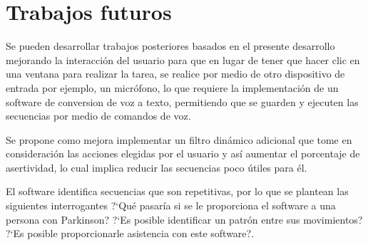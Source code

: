 \section{Trabajos futuros}
Se pueden desarrollar trabajos posteriores basados en el presente desarrollo
 mejorando la interacci\'on del usuario para que en lugar de tener que hacer 
 clic en una ventana para realizar la tarea, se realice por medio de otro 
 dispositivo de entrada por ejemplo, un micr\'ofono, lo que requiere la 
 implementaci\'on de un software de conversion de voz a texto, permitiendo que 
 se guarden y ejecuten las secuencias por medio de comandos de voz. 
 

Se propone como mejora implementar un filtro din\'amico adicional que tome en 
 consideraci\'on las acciones elegidas por el usuario y as\'i aumentar el 
 porcentaje de asertividad, lo cual implica reducir las secuencias poco \'utiles 
 para \'el.


El software identifica secuencias que son repetitivas, por lo que se 
 plantean las siguientes interrogantes ?`Qu\'e pasar\'ia si se le 
 proporciona el software a una persona con Parkinson?  
 ?`Es posible identificar un patr\'on entre sus movimientos? 
 ?`Es posible proporcionarle asistencia con este software?.
